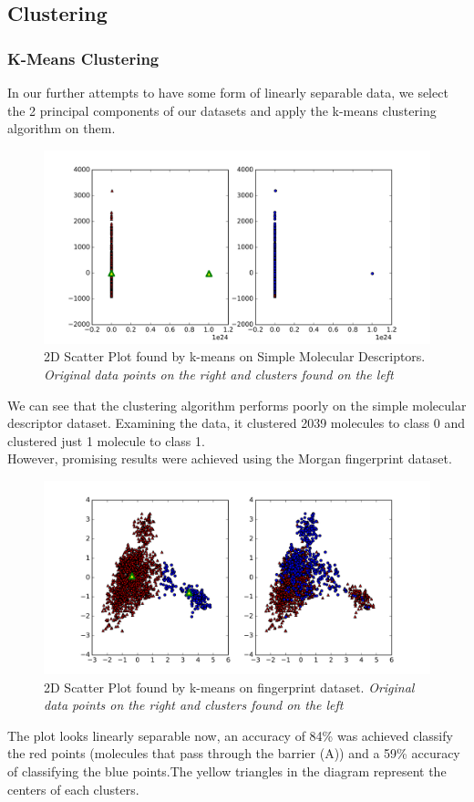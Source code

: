\documentclass[a4paper,12pt]{report}
\begin{document}
		\subsection{Clustering}
			\subsubsection{K-Means Clustering}
			In our further attempts to have some form of linearly separable data, we select the 2 principal components of our datasets and apply the k-means clustering algorithm on them.
			\begin{figure}[H]
				\centering
				\includegraphics[width=\textwidth,scale=1,totalheight=0.4\textheight]{images/kmeans_smd_scatter}
				\caption{2D Scatter Plot found by k-means on Simple Molecular Descriptors. \textit{Original data points on the right and clusters found on the left}}
				\label{fig:kmeans_smd_scatter}
			\end{figure}
			We can see that the clustering algorithm performs poorly on the simple molecular descriptor dataset. Examining the data, it clustered 2039 molecules to class 0 and clustered just 1 molecule to class 1. \\
			However, promising results were achieved using the Morgan fingerprint dataset.
			\begin{figure}[H]
				\centering
				\includegraphics[width=\textwidth,scale=1,totalheight=0.4\textheight]{images/kmeans_morgan_scatter}
				\caption{2D Scatter Plot found by k-means on fingerprint dataset. \textit{Original data points on the right and clusters found on the left}}
				\label{fig:kmeans_morgan_scatter}
			\end{figure}
			The plot looks linearly separable now, an accuracy of 84\% was achieved classify the red points (molecules that pass through the barrier (A)) and a 59\% accuracy of classifying the blue points.The yellow triangles in the diagram represent the centers of each clusters.
\end{document}
